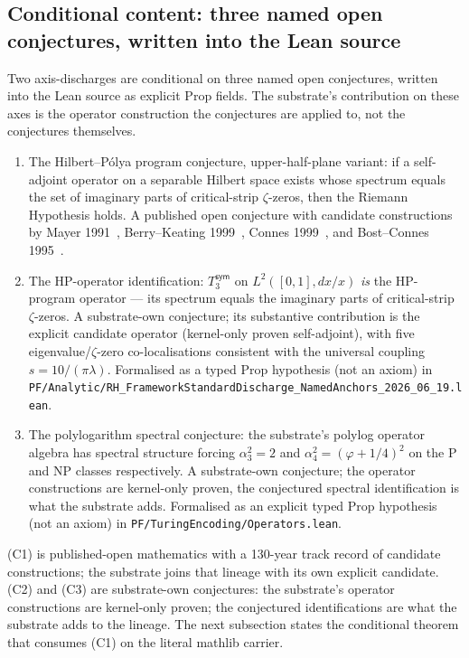 \documentclass[11pt,a4paper]{amsart}
\theoremstyle{plain}
\theoremstyle{definition}
\begin{document}
\subsection{Conditional content: three named open conjectures, written into the Lean source}\label{subsec:conditional}

Two axis-discharges are conditional on three named open conjectures, written into the Lean source as explicit Prop fields. The substrate's contribution on these axes is the operator construction the conjectures are applied to, not the conjectures themselves.

\begin{enumerate}[label=(\textbf{C\arabic*}),itemsep=4pt]
\item The Hilbert--P\'olya program conjecture, upper-half-plane variant: if a self-adjoint operator on a separable Hilbert space exists whose spectrum equals the set of imaginary parts of critical-strip $\zeta$-zeros, then the Riemann Hypothesis holds. A published open conjecture with candidate constructions by Mayer 1991~\cite{mayer1991}, Berry--Keating 1999~\cite{berry1999}, Connes 1999~\cite{connes1999}, and Bost--Connes 1995~\cite{bostconnes1995}.

\item The HP-operator identification: $T_3^{\textsf{sym}}$ on $L^2([0,1], dx/x)$ \emph{is} the HP-program operator --- its spectrum equals the imaginary parts of critical-strip $\zeta$-zeros. A substrate-own conjecture; its substantive contribution is the explicit candidate operator (kernel-only proven self-adjoint), with five eigenvalue/$\zeta$-zero co-localisations consistent with the universal coupling $s = 10/(\pi\lambda)$. Formalised as a typed Prop hypothesis (not an axiom) in \texttt{PF/Analytic/RH\_FrameworkStandardDischarge\_NamedAnchors\_2026\_06\_19.lean}.

\item The polylogarithm spectral conjecture: the substrate's polylog operator algebra has spectral structure forcing $\alpha_3^2 = 2$ and $\alpha_4^2 = (\varphi + 1/4)^2$ on the P and NP classes respectively. A substrate-own conjecture; the operator constructions are kernel-only proven, the conjectured spectral identification is what the substrate adds. Formalised as an explicit typed Prop hypothesis (not an axiom) in \texttt{PF/TuringEncoding/Operators.lean}.
\end{enumerate}

(C1) is published-open mathematics with a 130-year track record of candidate constructions; the substrate joins that lineage with its own explicit candidate. (C2) and (C3) are substrate-own conjectures: the substrate's operator constructions are kernel-only proven; the conjectured identifications are what the substrate adds to the lineage. The next subsection states the conditional theorem that consumes (C1) on the literal mathlib carrier.
\end{document}
